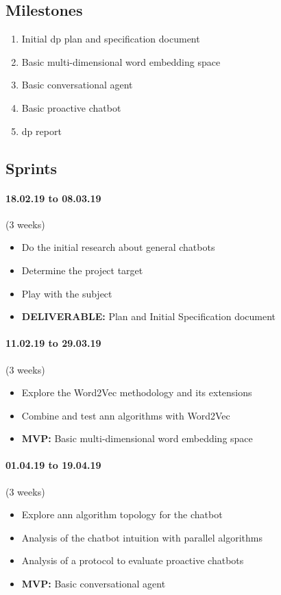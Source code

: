 \subsection{Milestones}
\begin{enumerate}
    \setlength\itemsep{0em}
    \item Initial \gls{dp} plan and specification document
    \item Basic multi-dimensional word embedding space
    \item Basic conversational agent
    \item Basic proactive chatbot
    \item \gls{dp} report
\end{enumerate}

\subsection{Sprints}

\paragraph{18.02.19 to 08.03.19} (3 weeks) 
\begin{itemize}
    \setlength\itemsep{0em}
    \item Do the initial research about general chatbots
    \item Determine the project target
    \item Play with the subject
    \item \textbf{DELIVERABLE:} Plan and Initial Specification document
\end{itemize}

\paragraph{11.02.19 to 29.03.19} (3 weeks)
\begin{itemize}
    \setlength\itemsep{0em}
    \item Explore the Word2Vec methodology and its extensions
    \item Combine and test \acrshort{ann} algorithms with Word2Vec
    \item \textbf{MVP:} Basic multi-dimensional word embedding space
\end{itemize}

\paragraph{01.04.19 to 19.04.19} (3 weeks)
\begin{itemize}
    \setlength\itemsep{0em}
    \item Explore \acrshort{ann} algorithm topology for the chatbot
    \item Analysis of the chatbot intuition with parallel algorithms
    \item Analysis of a protocol to evaluate proactive chatbots
    \item \textbf{MVP:} Basic conversational agent
\end{itemize}

